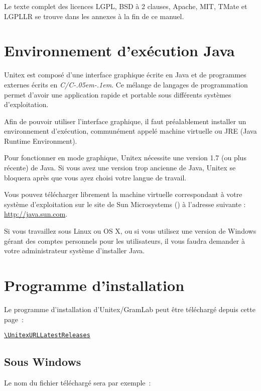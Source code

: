 \bigskip
\noindent Le texte complet des licences LGPL, BSD à 2 clauses, Apache, MIT, TMate et LGPLLR
se trouve dans les annexes à la fin de ce manuel.

\section{Environnement d’exécution Java}
Unitex est composé d’une interface graphique écrite en Java et de programmes externes
écrits en \textit{C/C\kern-.05em\raisebox{.5ex}{++}\kern-.1em}. Ce mélange de langages de 
programmation permet d’avoir une application rapide et portable sous différents systèmes d’exploitation.


\bigskip
\noindent Afin de pouvoir utiliser l’interface graphique, il faut préalablement installer
un environnement d’exécution, communément appelé machine virtuelle  ou
JRE (Java Runtime Environment).

\bigskip
\noindent Pour fonctionner en mode graphique, Unitex nécessite une version 1.7 (ou plus récente)
de Java. Si vous avez une version trop ancienne de Java, Unitex se bloquera après que vous
ayez choisi votre langue de travail.


\bigskip
\noindent Vous pouvez télécharger librement la machine virtuelle correspondant à votre 
système d’exploitation sur le site de Sun Microsystems (\cite{site-java}) à l’adresse suivante : 
\url{http://java.sun.com}.

\bigskip
\noindent Si vous travaillez sous Linux ou OS X, ou si vous
utilisez une version de Windows gérant des comptes personnels pour les utilisateurs, il vous
faudra demander à votre administrateur système d’installer Java.


\section{Programme d'installation}
\begin{samepage}
Le programme d'installation d'Unitex/GramLab peut être téléchargé depuis cette page~:

\begin{center}
{\tt\url{\UnitexURLLatestReleases}}
\end{center}
\end{samepage}

\subsection{Sous Windows}
Le nom du fichier téléchargé sera par exemple~:

